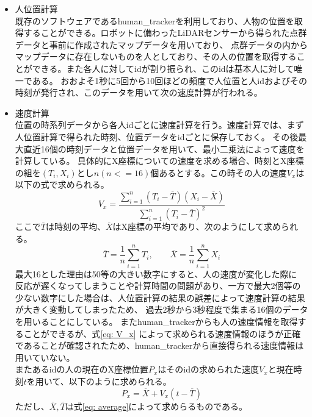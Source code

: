 \documentclass{kuisthesis}
\begin{document}
\begin{itemize}
  \item 人位置計算 \\
  既存のソフトウェアであるhuman\_trackerを利用しており、人物の位置を取得することができる。ロボットに備わったLiDARセンサーから得られた点群データと事前に作成されたマップデータを用いており、
  点群データの内からマップデータに存在しないものを人としており、その人の位置を取得することができる。また各人に対してidが割り振られ、このidは基本人に対して唯一である。
  おおよそ1秒に5回から10回ほどの頻度で人位置と人idおよびその時刻が発行され、このデータを用いて次の速度計算が行われる。
  \item 速度計算 \\
  位置の時系列データから各人idごとに速度計算を行う。速度計算では、まず人位置計算で得られた時刻、位置データをidごとに保存しておく。
  その後最大直近16個の時刻データと位置データを用いて、最小二乗法によって速度を計算している。
  具体的にX座標についての速度を求める場合、時刻とX座標の組を$(T_i, X_i)$とし$n(n <= 16)$個あるとする。この時その人の速度$V_x$は以下の式で求められる。
  \begin{equation}
    \label{eq: V_x}
    V_x = \frac{\sum_{i=1}^{n} (T_i - \overline{T})(X_i - \overline{X})}{\sum_{i=1}^{n} (T_i - \overline{T})^2}
  \end{equation}
  ここで$\overline{T}$は時刻の平均、$\overline{X}$はX座標の平均であり、次のようにして求められる。
  \begin{equation}
    \label{eq: average}
    \overline{T} = \frac{1}{n}\sum_{i=1}^{n} T_i, \qquad \overline{X} = \frac{1}{n}\sum_{i=1}^{n} X_i
  \end{equation}
  最大16とした理由は50等の大きい数字にすると、人の速度が変化した際に
  反応が遅くなってしまうことや計算時間の問題があり、一方で最大2個等の少ない数字にした場合は、人位置計算の結果の誤差によって速度計算の結果が大きく変動してしまったため、
  過去2秒から3秒程度で集まる16個のデータを用いることにしている。
  またhuman\_trackerからも人の速度情報を取得することができるが、式\ref{eq: V_x}
  によって求められる速度情報のほうが正確であることが確認されたため、human\_trackerから直接得られる速度情報は用いていない。 \\
  \quad またあるidの人の現在のX座標位置$P_x$はそのidの求められた速度$V_x$と現在時刻$t$を用いて、以下のように求められる。
  \begin{equation}
    \label{eq: P_x}
    P_x = \overline{X} + V_x(t - \overline{T})
  \end{equation}
  ただし、$\overline{X}, \overline{T}$は式\ref{eq: average}によって求めらるものである。
  

\end{itemize}
\end{document}
